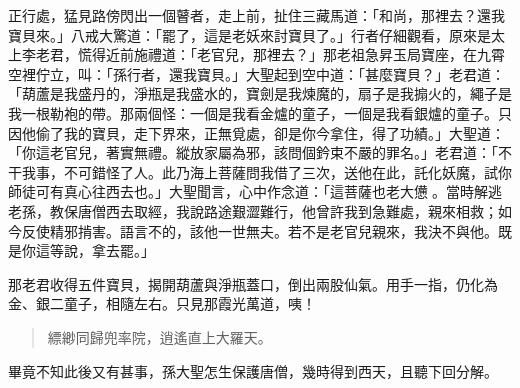正行處，猛見路傍閃出一個瞽者，走上前，扯住三藏馬道：「和尚，那裡去？還我寶貝來。」八戒大驚道：「罷了，這是老妖來討寶貝了。」行者仔細觀看，原來是太上李老君，慌得近前施禮道：「老官兒，那裡去？」那老祖急昇玉局寶座，在九霄空裡佇立，叫：「孫行者，還我寶貝。」大聖起到空中道：「甚麼寶貝？」老君道：「葫蘆是我盛丹的，淨瓶是我盛水的，寶劍是我煉魔的，扇子是我搧火的，繩子是我一根勒袍的帶。那兩個怪：一個是我看金爐的童子，一個是我看銀爐的童子。只因他偷了我的寶貝，走下界來，正無覓處，卻是你今拿住，得了功績。」大聖道：「你這老官兒，著實無禮。縱放家屬為邪，該問個鈐束不嚴的罪名。」老君道：「不干我事，不可錯怪了人。此乃海上菩薩問我借了三次，送他在此，託化妖魔，試你師徒可有真心往西去也。」大聖聞言，心中作念道：「這菩薩也老大憊𪬯。當時解逃老孫，教保唐僧西去取經，我說路途艱澀難行，他曾許我到急難處，親來相救；如今反使精邪掯害。語言不的，該他一世無夫。若不是老官兒親來，我決不與他。既是你這等說，拿去罷。」

那老君收得五件寶貝，揭開葫蘆與淨瓶蓋口，倒出兩股仙氣。用手一指，仍化為金、銀二童子，相隨左右。只見那霞光萬道，咦！
\begin{quote}
縹緲同歸兜率院，逍遙直上大羅天。
\end{quote}

畢竟不知此後又有甚事，孫大聖怎生保護唐僧，幾時得到西天，且聽下回分解。
